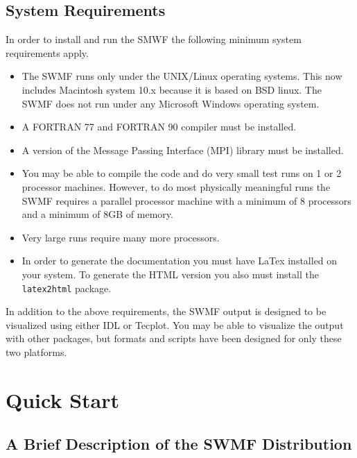 \section{System Requirements}

In order to install and run the SMWF the following minimum system
requirements apply.

\begin{itemize}
\item The SWMF runs only under the UNIX/Linux operating systems.  This now
  includes Macintosh system 10.x because it is based on BSD linux.  The
  SWMF does not run under any Microsoft Windows operating system.
\item A FORTRAN 77 and FORTRAN 90 compiler must be installed.
\item A version of the Message Passing Interface (MPI) library must be
  installed.
\item You may be able to compile the code and do very small test
runs on 1 or 2 processor machines.  However, to do most physically
meaningful runs the SWMF requires a
parallel processor machine with a minimum of 8 processors and a minimum of 8GB of
memory.
\item Very large runs require many more processors.
\item In order to generate the documentation you must have LaTex installed on
your system.  To generate the HTML version you also must install the
{\tt latex2html} package. 

\end{itemize}


In addition to the above requirements, the SWMF output is designed to
be visualized using either IDL or Tecplot.  You may be able to
visualize the output with other packages, but formats and scripts have
been designed for only these two platforms.





\chapter{Quick Start}

\section{A Brief Description of the SWMF Distribution}

